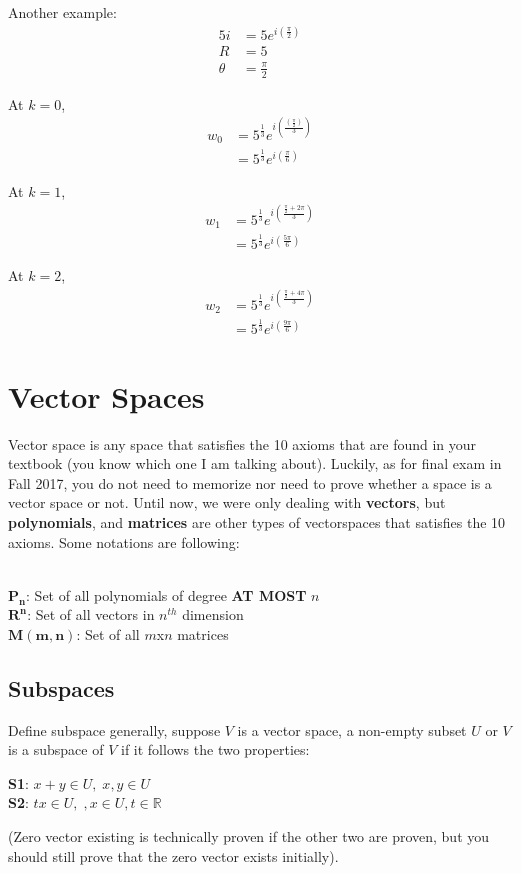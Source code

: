 \documentclass[12pt]{article}
\newcommand{\R}{\mathbb{R}}
\begin{document}
Another example:
\begin{align*}
5i &= 5e^{i(\frac{\pi}{2})} \\
R &= 5 \\
\theta &= \frac{\pi}{2}
\end{align*}

At $k=0$, 
\begin{align*}
w_0 &= 5^{\frac{1}{3}} e^{i(\frac{(\frac{\pi}{2})}{3})} \\
&= 5^{\frac{1}{3}} e^{i(\frac{\pi}{6})} 
\end{align*}

At $k=1$, 
\begin{align*}
w_1 &= 5^{\frac{1}{3}} e^{i(\frac{\frac{\pi}{2} + 2\pi}{3})} \\
&= 5^{\frac{1}{3}} e^{i(\frac{5\pi}{6})} 
\end{align*}

At $k=2$, 
\begin{align*}
w_2 &= 5^{\frac{1}{3}} e^{i(\frac{\frac{\pi}{2} + 4\pi}{3})} \\
&= 5^{\frac{1}{3}} e^{i(\frac{9\pi}{6})} 
\end{align*}

\section{Vector Spaces}
Vector space is any space that satisfies the 10 axioms that are found in your textbook (you know which one I am talking about). Luckily, as for final exam in Fall 2017, you do not need to memorize nor need to prove whether a space is a vector space or not. 
Until now, we were only dealing with \textbf{vectors}, but \textbf{polynomials}, and \textbf{matrices} are other types of vectorspaces that satisfies the 10 axioms. Some notations are following: \\\\
\begin{centering}
$\mathbf{P_n}$: Set of all polynomials of degree \textbf{AT MOST} $n$\\
$\mathbf{R^n}$: Set of all vectors in $n^{th}$ dimension\\
$\mathbf{M(m,n)}$: Set of all $m$x$n$ matrices \\
\end{centering}

\subsection{Subspaces}
Define subspace generally, suppose $V$ is a vector space, a non-empty subset  $U$ or $V$ is a subspace of $V$ if it follows the two properties:\\
\begin{centering}
\textbf{S1}: $x + y \in U, \; x,y \in U$\\
\textbf{S2}: $tx \in U, \;, x\in U, t\in\R$\\ 
\end{centering}
(Zero vector existing is technically proven if the other two are proven, but you should still prove that the zero vector exists initially).
\end{document}

